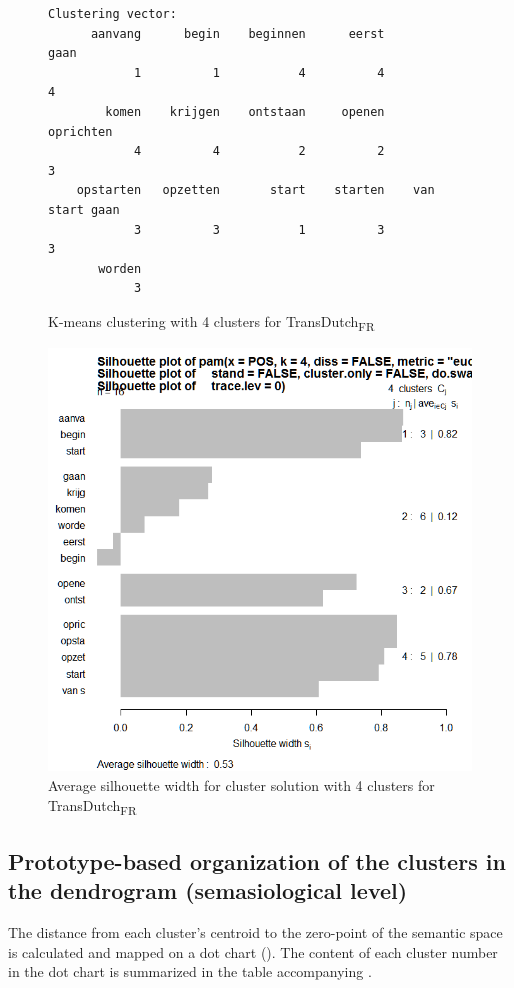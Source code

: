 \begin{figure}
\footnotesize
\begin{lstlisting}
Clustering vector:
      aanvang      begin    beginnen      eerst              gaan 
            1          1           4          4                 4
        komen    krijgen    ontstaan     openen         oprichten
            4          4           2          2                 3
    opstarten   opzetten       start    starten    van start gaan
            3          3           1          3                 3
       worden               
            3               
\end{lstlisting}
\caption{\label{fig:4:kmeansdutch4}  K-means clustering with 4 clusters for TransDutch\textsubscript{FR}}
\end{figure}

\begin{figure}
\includegraphics[height=.4\textheight]{figures/Vandevoorde2-img80.png}
\caption{\label{fig:4:77}  Average silhouette width for cluster solution with 4 clusters for TransDutch\textsubscript{FR}}
\end{figure}

\subsection{Prototype-based organization of the clusters in the dendrogram (semasiological level)}
\label{sec:4.4.2}  
The distance from each cluster’s centroid to the zero-point of the semantic space is calculated and mapped on a dot chart (). The content of each cluster number in the dot chart is summarized in the table accompanying .

